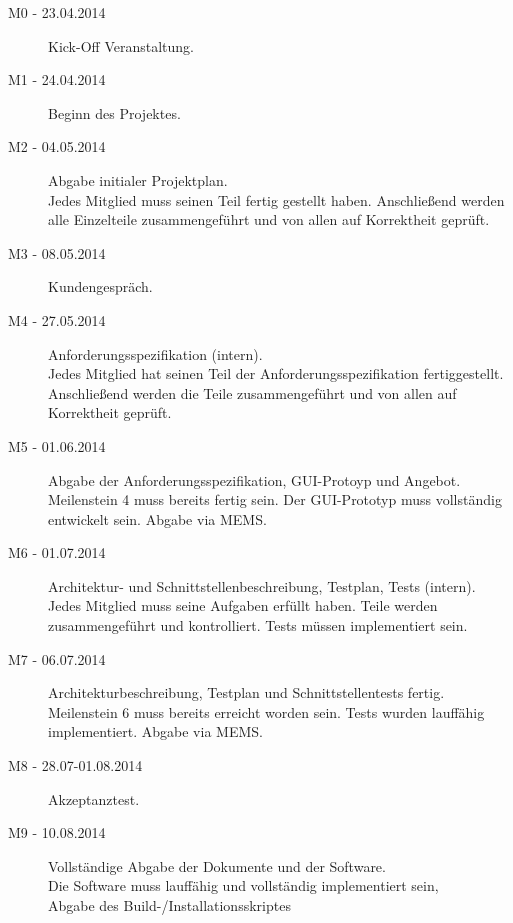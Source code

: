 \documentclass[fontsize=12pt,paper=a4,twoside]{scrartcl}
\begin{document}
\begin{description}
\item[M0 - 23.04.2014] Kick-Off Veranstaltung.

\item[M1 - 24.04.2014] Beginn des Projektes.

\item[M2 - 04.05.2014] Abgabe initialer Projektplan.\\
Jedes Mitglied muss seinen Teil fertig gestellt haben. Anschließend werden alle Einzelteile zusammengeführt und von allen auf Korrektheit geprüft.

\item[M3 - 08.05.2014] Kundengespräch.

\item[M4 - 27.05.2014] Anforderungsspezifikation (intern). \\
Jedes Mitglied hat seinen Teil der Anforderungsspezifikation fertiggestellt. Anschließend werden die Teile zusammengeführt und von allen auf Korrektheit geprüft.

\item[M5 - 01.06.2014] Abgabe der Anforderungsspezifikation, GUI-Protoyp und Angebot. \\
Meilenstein 4 muss bereits fertig sein. Der GUI-Prototyp muss vollständig entwickelt sein. Abgabe via MEMS.

\item[M6 - 01.07.2014] Architektur- und Schnittstellenbeschreibung, Testplan, Tests (intern).\\
Jedes Mitglied muss seine Aufgaben erfüllt haben. Teile werden zusammengeführt und kontrolliert. Tests müssen implementiert sein.

\item[M7 - 06.07.2014] Architekturbeschreibung, Testplan und Schnittstellentests fertig.\\
Meilenstein 6 muss bereits erreicht worden sein. Tests wurden lauffähig implementiert. Abgabe via MEMS.

\item[M8 - 28.07-01.08.2014] Akzeptanztest.

\item[M9 - 10.08.2014] Vollständige Abgabe der Dokumente und der Software. \\
Die Software muss lauffähig und vollständig implementiert sein,\\
Abgabe des Build-/Installationsskriptes
\end{description}
\end{document}

